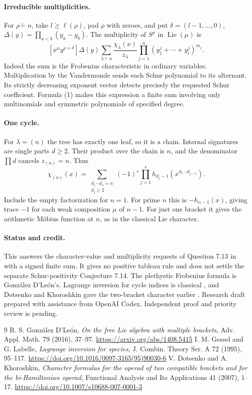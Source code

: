 \documentclass[11pt]{article}
\begin{document}
\paragraph{Irreducible multiplicities.}
For $\rho\vdash n$, take $l\ge\ell(\rho)$, pad $\rho$ with zeroes, and put
$\delta=(l-1,\ldots,0)$, $\Delta(y)=\prod_{a<b}(y_a-y_b)$.
The multiplicity of $S^\rho$ in $\operatorname{Lie}(\mu)$ is
\[
 [x^\mu y^{\rho+\delta}]\Delta(y)
   \sum_{\lambda\vdash n}\frac{\chi_\lambda(x)}{z_\lambda}
     \prod_{j=1}^n (y_1^j+\cdots+y_l^j)^{m_j}.
\]
Indeed the sum is the Frobenius characteristic in ordinary variables.
Multiplication by the Vandermonde sends each Schur polynomial to its
alternant. Its strictly decreasing exponent vector detects precisely the
requested Schur coefficient. Formula (1) makes this expression a finite
sum involving only multinomials and symmetric polynomials of specified degree.

\paragraph{One cycle.}
For $\lambda=(n)$ the tree has exactly one leaf, so it is a chain. Internal
signatures are single parts $d\ge2$. Their product over the chain is $n$,
and the denominator $\prod d$ cancels $z_{(n)}=n$. Thus
\[
 \chi_{(n)}(x)=
 \sum_{\substack{d_1\cdots d_s=n\\d_j\ge2}}(-1)^s
     \prod_{j=1}^s h_{d_j-1}(x^{d_1\cdots d_{j-1}}).
\]
Include the empty factorization for $n=1$. For prime $n$ this is
$-h_{n-1}(x)$, giving trace $-1$ for each weak composition $\mu$ of $n-1$.
For just one bracket it gives the arithmetic M\"obius function at $n$,
as in the classical Lie character.

\paragraph{Status and credit.} This answers the character-value and
multiplicity requests of Question 7.13 in \cite{g} with a signed finite
sum. It gives no positive tableau rule and does not settle the separate
Schur-positivity Conjecture 7.14. The plethystic Frobenius formula is
Gonz\'alez D'Le\'on's. Lagrange inversion for cycle indices is classical
\cite{gl}, and Dotsenko and Khoroshkin gave the two-bracket character earlier
\cite{dk}. Research draft prepared with assistance from OpenAI Codex.
Independent proof and priority review is pending.
\begin{thebibliography}{9}
 R. S. Gonz\'alez D'Le\'on, \emph{On the free Lie algebra with
multiple brackets}, Adv. Appl. Math. 79 (2016), 37--97.
\url{https://arxiv.org/abs/1408.5415}
 I. M. Gessel and G. Labelle, \emph{Lagrange inversion for
species}, J. Combin. Theory Ser. A 72 (1995), 95--117. \url{https://doi.org/10.1016/0097-3165(95)90030-6}
 V. Dotsenko and A. Khoroshkin, \emph{Character formulas for
the operad of two compatible brackets and for the bi-Hamiltonian operad},
Functional Analysis and Its Applications 41 (2007), 1--17. \url{https://doi.org/10.1007/s10688-007-0001-3}
\end{thebibliography}
\end{document}
